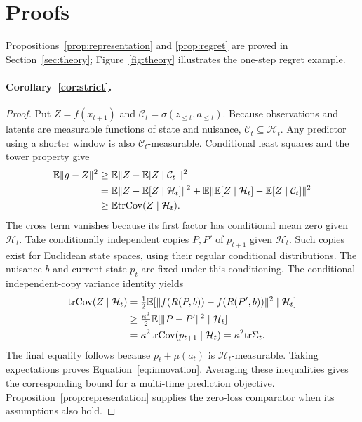 \section{Proofs}
\label{app:proofs}

Propositions~\ref{prop:representation} and \ref{prop:regret} are proved in Section~\ref{sec:theory};
Figure~\ref{fig:theory} illustrates the one-step regret example.

\paragraph{Corollary~\ref{cor:strict}.}
\begin{proof}
Put $Z=f(x_{t+1})$ and $\mathcal C_t=\sigma(z_{\le t},a_{\le t})$.
Because observations and latents are measurable functions of state and nuisance, $\mathcal C_t\subseteq\mathcal H_t$.
Any predictor using a shorter window is also $\mathcal C_t$-measurable.
Conditional least squares and the tower property give
\begin{align*}
\mathbb{E}\|g-Z\|^2
&\ge\mathbb{E}\|Z-\mathbb{E}[Z\mid\mathcal C_t]\|^2\\
&=\mathbb{E}\|Z-\mathbb{E}[Z\mid\mathcal H_t]\|^2
 +\mathbb{E}\|\mathbb{E}[Z\mid\mathcal H_t]-\mathbb{E}[Z\mid\mathcal C_t]\|^2\\
&\ge\mathbb{E}\mathrm{tr}\mathrm{Cov}(Z\mid\mathcal H_t).
\end{align*}
The cross term vanishes because its first factor has conditional mean zero given $\mathcal H_t$.
Take conditionally independent copies $P,P'$ of $p_{t+1}$ given $\mathcal H_t$.
Such copies exist for Euclidean state spaces, using their regular conditional distributions.
The nuisance $b$ and current state $p_t$ are fixed under this conditioning.
The conditional independent-copy variance identity yields
\begin{align*}
\mathrm{tr}\mathrm{Cov}(Z\mid\mathcal H_t)
&=\tfrac12\mathbb{E}[\|f(R(P,b))-f(R(P',b))\|^2\mid\mathcal H_t]\\
&\ge\tfrac{\kappa^2}{2}\mathbb{E}[\|P-P'\|^2\mid\mathcal H_t]\\
&=\kappa^2\mathrm{tr}\mathrm{Cov}(p_{t+1}\mid\mathcal H_t)
=\kappa^2\mathrm{tr}\Sigma_t.
\end{align*}
The final equality follows because $p_t+\mu(a_t)$ is $\mathcal H_t$-measurable.
Taking expectations proves Equation~\ref{eq:innovation}.
Averaging these inequalities gives the corresponding bound for a multi-time prediction objective.
Proposition~\ref{prop:representation} supplies the zero-loss comparator when its assumptions also hold.
\end{proof}

